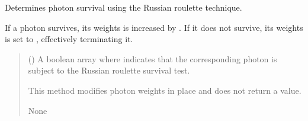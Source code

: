 \documentclass[letterpaper,10pt,english]{sphinxmanual}
\begin{document}
\begin{fulllineitems}
\begin{fulllineitems}
\begin{quote}
\begin{description}
\end{description}\end{quote}

\end{fulllineitems}


\begin{fulllineitems}
\label{\detokenize{generated/photon_canon.optics:photon_canon.optics.Photon.russian_roulette}}
\pysigstartsignatures
\pysiglinewithargsret
{}
{}
{}
\pysigstopsignatures
\sphinxAtStartPar
Determines photon survival using the Russian roulette technique.

\sphinxAtStartPar
If a photon survives, its weights is increased by .
If it does not survive, its weights is set to , effectively terminating it.
\begin{quote}\begin{description}
\sphinxAtStartPar
{} (\sphinxstyleliteralemphasis{\sphinxupquote{{[}}}\sphinxstyleliteralemphasis{\sphinxupquote{{]}}}) \textendash{} A boolean array where  indicates that the corresponding photon is
subject to the Russian roulette survival test.

\sphinxAtStartPar
This method modifies photon weights in place and does not return a value.

\sphinxAtStartPar
None

\end{description}\end{quote}

\end{fulllineitems}



\end{fulllineitems}
\end{document}
